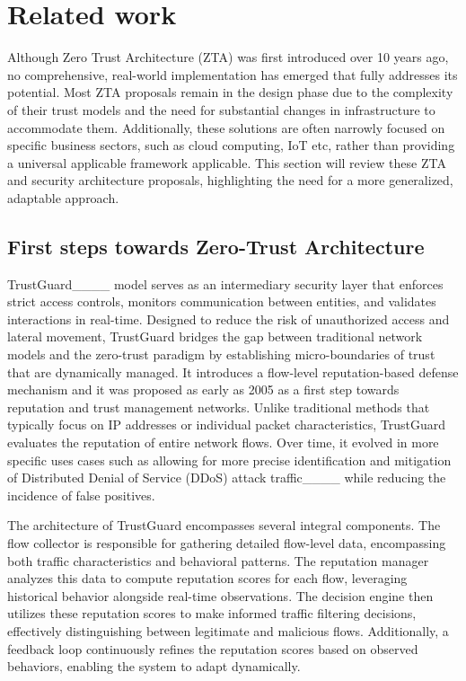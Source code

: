 \section{Related work}
Although Zero Trust Architecture (ZTA) was first introduced over 10 years ago, no comprehensive, real-world implementation has emerged that fully addresses its potential. Most ZTA proposals remain in the design phase due to the complexity of their trust models and the need for substantial changes in infrastructure to accommodate them. Additionally, these solutions are often narrowly focused on specific business sectors, such as cloud computing, IoT etc, rather than providing a universal applicable framework applicable. This section will review these ZTA and security architecture proposals, highlighting the need for a more generalized, adaptable approach.

\subsection{First steps towards Zero-Trust Architecture}
TrustGuard____ model serves as an intermediary security layer that enforces strict access controls, monitors communication between entities, and validates interactions in real-time. Designed to reduce the risk of unauthorized access and lateral movement, TrustGuard bridges the gap between traditional network models and the zero-trust paradigm by establishing micro-boundaries of trust that are dynamically managed. It introduces a flow-level reputation-based defense mechanism and it was proposed as early as 2005 as a first step towards reputation and trust management networks. Unlike traditional methods that typically focus on IP addresses or individual packet characteristics, TrustGuard evaluates the reputation of entire network flows. Over time, it evolved in more specific uses cases such as allowing for more precise identification and mitigation of Distributed Denial of Service (DDoS) attack traffic____ while reducing the incidence of false positives.

The architecture of TrustGuard encompasses several integral components. The flow collector is responsible for gathering detailed flow-level data, encompassing both traffic characteristics and behavioral patterns. The reputation manager analyzes this data to compute reputation scores for each flow, leveraging historical behavior alongside real-time observations. The decision engine then utilizes these reputation scores to make informed traffic filtering decisions, effectively distinguishing between legitimate and malicious flows. Additionally, a feedback loop continuously refines the reputation scores based on observed behaviors, enabling the system to adapt dynamically.

